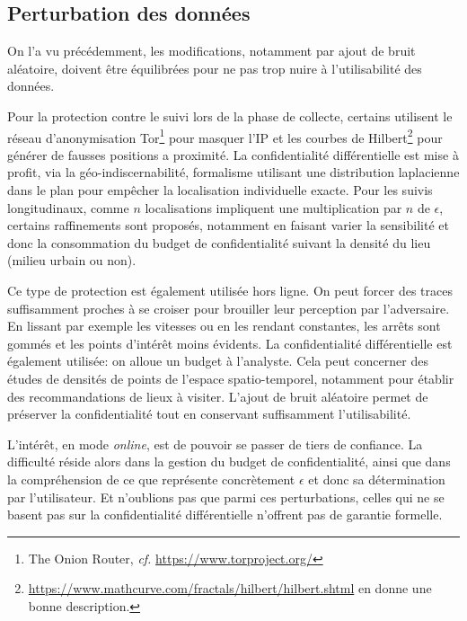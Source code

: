 \documentclass[a4paper,11pt]{article} %
\newcommand{\www}[2]{\href{#1}{\nolinkurl{#2}}}
\begin{document}
\subsection{Perturbation des données}
%
On l'a vu précédemment, les modifications, notamment par ajout de bruit aléatoire, doivent être équilibrées pour ne pas trop nuire à l'utilisabilité des données. 

Pour la protection contre le suivi lors de la phase de collecte, certains utilisent le réseau d'anonymisation Tor\footnote{The Onion Router, \emph{cf.} \url{https://www.torproject.org/}} pour masquer l'IP et les courbes de Hilbert\footnote{\url{https://www.mathcurve.com/fractals/hilbert/hilbert.shtml} en donne une bonne description.} pour générer de fausses positions a proximité.
La confidentialité différentielle est mise à profit, via la géo-indiscernabilité, formalisme utilisant une distribution laplacienne dans le plan pour empêcher la localisation individuelle exacte. Pour les suivis longitudinaux, comme $n$ localisations impliquent une multiplication par $n$ de $\epsilon$, certains raffinements sont proposés, notamment en faisant varier la sensibilité et donc la consommation du budget de confidentialité suivant la densité du lieu (milieu urbain ou non).%

Ce type de protection est également utilisée hors ligne.
On peut forcer des traces suffisamment proches à se croiser pour brouiller leur perception par l'adversaire. En lissant par exemple les vitesses ou en les rendant constantes, les arrêts sont gommés et les points d'intérêt moins évidents. 
La confidentialité différentielle est également utilisée: on alloue un budget à l'analyste.
Cela peut concerner des études de densités de points de l'espace spatio-temporel, notamment pour établir des recommandations de lieux à visiter.
L'ajout de bruit aléatoire permet de préserver la confidentialité tout en conservant suffisamment l'utilisabilité.

L'intérêt, en mode \emph{online}, est de pouvoir se passer de tiers de confiance. 
La difficulté réside alors dans la gestion du \og budget de confidentialité\fg{}, ainsi que dans la compréhension de ce que représente concrètement $\epsilon$ et donc sa détermination par l'utilisateur. 
Et n'oublions pas que parmi ces perturbations, celles qui ne se basent pas sur la confidentialité différentielle n'offrent pas de garantie formelle.
%
\end{document}
